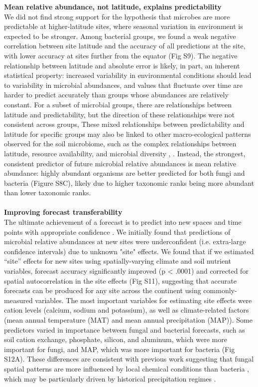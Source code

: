 \documentclass[11pt]{article}
\begin{document}
\textbf{Mean relative abundance, not latitude, explains predictability} \\
We did not find strong support for the hypothesis that microbes are more predictable at higher-latitude sites, where seasonal variation in environment is expected to be stronger. Among bacterial groups, we found a weak negative correlation between site latitude and the accuracy of all predictions at the site, with lower accuracy at sites further from the equator (Fig S9). The negative relationship between latitude and absolute error is likely, in part, an inherent statistical property: increased variability in environmental conditions should lead to variability in microbial abundances, and values that fluctuate over time are harder to predict accurately than groups whose abundances are relatively constant. For a subset of microbial groups, there are relationships between latitude and predictability, but the direction of these relationships were not consistent across groups, These mixed relationships between predictability and latitude for specific groups may also be linked to other macro-ecological patterns observed for the soil microbiome, such as the complex relationships between latitude, resource availability, and microbial diversity \cite{xiao_latitudinal_2021,andam_latitudinal_2016}, \cite{bickel_hierarchy_2019,bickel_soil_2020}. Instead, the strongest, consistent predictor of future microbial relative abundances is mean relative abundance: highly abundant organisms are better predicted for both fungi and bacteria (Figure S8C), likely due to higher taxonomic ranks being more abundant than lower taxonomic ranks.  \\
  \\
\textbf{Improving forecast transferability}   \\
The ultimate achievement of a forecast is to predict into new spaces and time points with appropriate confidence \cite{bodner_bridging_2021}. We initially found that predictions of microbial relative abundances at new sites were underconfident (i.e. extra-large confidence intervals) due to unknown "site" effects. We found that if we estimated “site” effects for new sites using spatially-varying climate and soil nutrient variables, forecast accuracy significantly improved (p < .0001) and corrected for spatial autocorrelation in the site effects (Fig S11), suggesting that accurate forecasts can be produced for any site across the continent using commonly-measured variables. The most important variables for estimating site effects were cation levels (calcium, sodium and potassium), as well as climate-related factors (mean annual temperature (MAT) and mean annual precipitation (MAP)). Some predictors varied in importance between fungal and bacterial forecasts, such as soil cation exchange, phosphate, silicon, and aluminum, which were more important for fungi, and MAP, which was more important for bacteria (Fig S12A). These differences are consistent with previous work suggesting that fungal spatial patterns are more influenced by local chemical conditions than bacteria \cite{tecon_biophysical_2017}, which may be particularly driven by historical precipitation regimes \cite{bissett_life_2010,Averill2016}.
\end{document}
